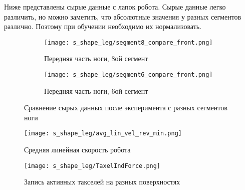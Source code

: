 
Ниже  представлены сырые данные с лапок робота. Сырые данные легко различить, но можно заметить, что абсолютные значения у разных сегментов различно. Поэтому при обучении необходимо их нормализовать.

\begin{figure}[H]
    \begin{subfigure}[t]{0.9\textwidth}
        \centering\texttt{[image: s\_shape\_leg/segment8\_compare\_front.png]}
        \caption{Передняя часть ноги, 8ой сегмент}
    \end{subfigure}

    \begin{subfigure}[t]{0.9\textwidth}
        \centering\texttt{[image: s\_shape\_leg/segment6\_compare\_front.png]}
        \caption{Передняя часть ноги, 6ой сегмент}
    \end{subfigure}
    \caption{Сравнение сырых данных после эксперимента с разных сегментов ноги}
    \label{fig:data_from_legs}
\end{figure}

\begin{figure}[H]
    \centering\texttt{[image: s\_shape\_leg/avg\_lin\_vel\_rev\_min.png]}
    \caption{Средняя линейная скорость робота}
    \label{fig:s_shape_leg/AverageVelocity (1).png}
\end{figure}

\begin{figure}[H]
    \centering\texttt{[image: s\_shape\_leg/TaxelIndForce.png]}
    \caption{Запись активных такселей на разных поверхностях}
    \label{fig:s_shape_leg/TaxelIndForce_full.png}
\end{figure}

